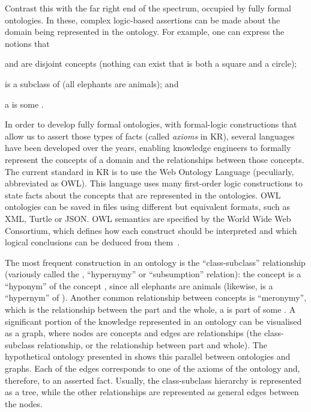 Contrast this with the far right end of the spectrum, occupied by fully formal ontologies. In these, complex logic-based assertions can be made about the domain being represented in the ontology. For example, one can express the notions that
\begin{paralist}
    \item {} and  are disjoint concepts (nothing can exist that is both a square and a circle);
    \item {} is a subclass of  (all elephants are animals); and
    \item a  is  some .
\end{paralist}

In order to develop fully formal ontologies, with formal-logic constructions that allow us to assert those types of facts (called \emph{axioms} in KR), several languages have been developed over the years, enabling knowledge engineers to formally represent the concepts of a domain and the relationships between those concepts. The current standard in KR is to use the Web Ontology Language (peculiarly, abbreviated as OWL). This language uses many first-order logic constructions to state facts about the concepts that are represented in the ontologies. OWL ontologies can be saved in files using different but equivalent formats, such as XML, Turtle or JSON. OWL semantics are specified by the World Wide Web Consortium, which defines how each construct should be interpreted and which logical conclusions can be deduced from them~\citep{Motik2012,Motik2012a}.

The most frequent construction in an ontology is the ``class-subclass'' relationship (variously called the , ``hypernymy'' or ``subsumption'' relation): \eg the concept  is a ``hyponym'' of the concept , since all elephants are animals (likewise,  is a ``hypernym'' of ). Another common relationship between concepts is ``meronymy'', which is the relationship between the part and the whole, \eg a  is part of some . A significant portion of the knowledge represented in an ontology can be visualised as a graph, where nodes are concepts and edges are relationships (\eg the class-subclass relationship, or the relationship between part and whole). The hypothetical ontology presented in  shows this parallel between ontologies and graphs. Each of the edges corresponds to one of the axioms of the ontology and, therefore, to an asserted fact. Usually, the class-subclass hierarchy is represented as a tree, while the other relationships are represented as general edges between the nodes.

